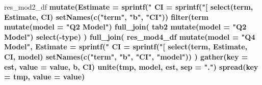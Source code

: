 \documentclass[]{article}
\newenvironment{Shaded}{\begin{snugshade}}{\end{snugshade}}
\newcommand{\KeywordTok}[1]{\textcolor[rgb]{0.13,0.29,0.53}{\textbf{#1}}}
\newcommand{\DataTypeTok}[1]{\textcolor[rgb]{0.13,0.29,0.53}{#1}}
\newcommand{\StringTok}[1]{\textcolor[rgb]{0.31,0.60,0.02}{#1}}
\newcommand{\OperatorTok}[1]{\textcolor[rgb]{0.81,0.36,0.00}{\textbf{#1}}}
\newcommand{\NormalTok}[1]{#1}
\begin{document}
\begin{Shaded}
\begin{Highlighting}[]
{\NormalTok{res_mod2_df }\OperatorTok{%>%}\StringTok{ }
\StringTok{  }\KeywordTok{mutate}\NormalTok{(}\DataTypeTok{Estimate =} \KeywordTok{sprintf}\NormalTok{(}\StringTok{"%.2f"}\NormalTok{, Estimate),}
         \DataTypeTok{CI =} \KeywordTok{sprintf}\NormalTok{(}\StringTok{"[%.2f, %.2f]"}\NormalTok{, lwr, upr)) }\OperatorTok{%>%}
\StringTok{  }\KeywordTok{select}\NormalTok{(term, Estimate, CI) }\OperatorTok{%>%}
\StringTok{  }\KeywordTok{setNames}\NormalTok{(}\KeywordTok{c}\NormalTok{(}\StringTok{"term"}\NormalTok{, }\StringTok{"b"}\NormalTok{, }\StringTok{"CI"}\NormalTok{)) }\OperatorTok{%>%}
\StringTok{  }\KeywordTok{filter}\NormalTok{(term }\OperatorTok{%in%}\StringTok{ }\KeywordTok{c}\NormalTok{(}\StringTok{"female"}\NormalTok{, }\StringTok{"minority"}\NormalTok{, }\StringTok{"minority:female"}\NormalTok{)) }\OperatorTok{%>%}
\StringTok{  }\KeywordTok{mutate}\NormalTok{(}\DataTypeTok{model =} \StringTok{"Q2 Model"}\NormalTok{) }\OperatorTok{%>%}\StringTok{ }
\StringTok{  }\KeywordTok{full_join}\NormalTok{(}
\NormalTok{    tab2 }\OperatorTok{%>%}\StringTok{ }\KeywordTok{filter}\NormalTok{(type }\OperatorTok{==}\StringTok{ "Fixed Parts"}\NormalTok{) }\OperatorTok{%>%}
\StringTok{              }\KeywordTok{mutate}\NormalTok{(}\DataTypeTok{model =} \StringTok{"Q2 Model"}\NormalTok{) }\OperatorTok{%>%}
\StringTok{              }\KeywordTok{select}\NormalTok{(}\OperatorTok{-}\NormalTok{type)}
\NormalTok{  ) }\OperatorTok{%>%}
\StringTok{  }\KeywordTok{full_join}\NormalTok{(}
\NormalTok{    res_mod4_df }\OperatorTok{%>%}\StringTok{ }
\StringTok{      }\KeywordTok{mutate}\NormalTok{(}\DataTypeTok{model =} \StringTok{"Q4 Model"}\NormalTok{,}
             \DataTypeTok{Estimate =} \KeywordTok{sprintf}\NormalTok{(}\StringTok{"%.2f"}\NormalTok{, Estimate),}
             \DataTypeTok{CI =} \KeywordTok{sprintf}\NormalTok{(}\StringTok{"[%.2f, %.2f]"}\NormalTok{, lwr, upr)) }\OperatorTok{%>%}
\StringTok{      }\KeywordTok{select}\NormalTok{(term, Estimate, CI, model) }\OperatorTok{%>%}
\StringTok{      }\KeywordTok{setNames}\NormalTok{(}\KeywordTok{c}\NormalTok{(}\StringTok{"term"}\NormalTok{, }\StringTok{"b"}\NormalTok{, }\StringTok{"CI"}\NormalTok{, }\StringTok{"model"}\NormalTok{))}
\NormalTok{  ) }\OperatorTok{%>%}
\StringTok{  }\KeywordTok{gather}\NormalTok{(}\DataTypeTok{key =}\NormalTok{ est, }\DataTypeTok{value =}\NormalTok{ value, b, CI) }\OperatorTok{%>%}
\StringTok{  }\KeywordTok{unite}\NormalTok{(tmp, model, est, }\DataTypeTok{sep =} \StringTok{"."}\NormalTok{) }\OperatorTok{%>%}
\StringTok{  }\KeywordTok{spread}\NormalTok{(}\DataTypeTok{key =}\NormalTok{ tmp, }\DataTypeTok{value =}\NormalTok{ value) }\OperatorTok{%>%}
}}}}}}}}}}}}}}}}}}}
\end{Highlighting}
\end{Shaded}
\end{document}
